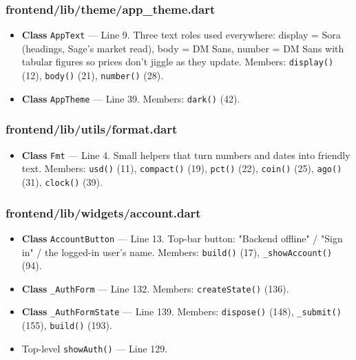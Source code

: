 \subsubsection*{frontend/lib/theme/app\_theme.dart}
\begin{itemize}[nosep,leftmargin=1.5em]
\item \textbf{Class} \texttt{AppText} --- Line 9. Three text roles used everywhere: display = Sora (headings, Sage's market read), body = DM Sans, number = DM Sans with tabular figures so prices don't jiggle as they update. Members: \texttt{display(\allowbreak{})} (12), \texttt{body(\allowbreak{})} (21), \texttt{number(\allowbreak{})} (28).
\item \textbf{Class} \texttt{AppTheme} --- Line 39. Members: \texttt{dark(\allowbreak{})} (42).
\end{itemize}
\subsubsection*{frontend/lib/utils/format.dart}
\begin{itemize}[nosep,leftmargin=1.5em]
\item \textbf{Class} \texttt{Fmt} --- Line 4. Small helpers that turn numbers and dates into friendly text. Members: \texttt{usd(\allowbreak{})} (11), \texttt{compact(\allowbreak{})} (19), \texttt{pct(\allowbreak{})} (22), \texttt{coin(\allowbreak{})} (25), \texttt{ago(\allowbreak{})} (31), \texttt{clock(\allowbreak{})} (39).
\end{itemize}
\subsubsection*{frontend/lib/widgets/account.dart}
\begin{itemize}[nosep,leftmargin=1.5em]
\item \textbf{Class} \texttt{AccountButton} --- Line 13. Top-bar button: "Backend offline" / "Sign in" / the logged-in user's name. Members: \texttt{build(\allowbreak{})} (17), \texttt{\_\allowbreak{}showAccount(\allowbreak{})} (94).
\item \textbf{Class} \texttt{\_\allowbreak{}AuthForm} --- Line 132. Members: \texttt{createState(\allowbreak{})} (136).
\item \textbf{Class} \texttt{\_\allowbreak{}AuthFormState} --- Line 139. Members: \texttt{dispose(\allowbreak{})} (148), \texttt{\_\allowbreak{}submit(\allowbreak{})} (155), \texttt{build(\allowbreak{})} (193).
\item Top-level \texttt{showAuth(\allowbreak{})} --- Line 129.
\end{itemize}
